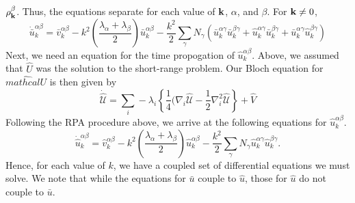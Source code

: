 \documentclass{article}
\begin{document}
$\rho^\beta_{\mathbf{k}}$.  Thus, the equations separate for each value of
$\mathbf{k}$, $\alpha$, and $\beta$.  For $\mathbf{k} \neq 0$,
\begin{equation}
\dot{\bar{u}}_k^{\alpha \beta} = \bar{v}_k^{\alpha \beta} 
- k^2 \left(\frac{\lambda_\alpha+\lambda_\beta}{2}\right)
\bar{u}_k^{\alpha\beta} -\frac{k^2}{2} \sum_\gamma N_\gamma
\left(
\bar{u}_k^{\alpha \gamma} \bar{u}_k^{\beta \gamma} +
\hat{u}_k^{\alpha \gamma} \bar{u}_k^{\beta \gamma} +
\bar{u}_k^{\alpha \gamma} \hat{u}_k^{\beta \gamma}
\right)
\end{equation}
Next, we need an equation for the time propogation of
$\hat{u}_k^{\alpha \beta}$.  Above, we assumed that $\hat{U}$ was the
solution to the short-range problem.  Our Bloch equation for
$\hat{mathcal{U}}$ is then given by
\begin{equation}
\dot{\hat{\mathcal{U}}} = \sum_i -\lambda_i
\left\{ \frac{1}{4} (\nabla_i \hat{\mathcal{U}} 
-\frac{1}{2} \nabla_i^2 \hat{\mathcal{U}} \right\} + \hat{V}
\end{equation}
Following the RPA procedure above, we arrive at the following
equations for $\hat{u}_k^{\alpha\beta}$.
\begin{equation}
\dot{\hat{u}}^{\alpha \beta}_k = \hat{v}^{\alpha \beta}_k
-k^2 \left( \frac{\lambda_\alpha + \lambda_\beta}{2} \right)
\hat{u}^{\alpha \beta}_k - \frac{k^2}{2} \sum_\gamma N_\gamma
\hat{u}^{\alpha \gamma}_k \hat{u}^{\beta \gamma}_k.
\end{equation}
Hence, for each value of $k$, we have a coupled set of differential
equations we must solve.  We note that while the equations for
$\bar{u}$ couple to $\hat{u}$, those for $\hat{u}$ do not couple to
$\bar{u}$.
\end{document}
